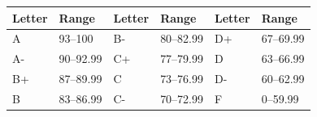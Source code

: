 \begin{tabularx}{\textwidth}{@{}C{0.07\textwidth}X C{0.07\textwidth}X C{0.07\textwidth}X@{}}
\toprule
Letter & Range & Letter & Range & Letter & Range \\
\midrule
A & 93--100 & B- & 80--82.99 & D+ & 67--69.99 \\
A- & 90--92.99 & C+ & 77--79.99 & D & 63--66.99 \\
B+ & 87--89.99 & C & 73--76.99 & D- & 60--62.99 \\
B & 83--86.99 & C- & 70--72.99 & F & 0--59.99 \\
\bottomrule
\end{tabularx}
